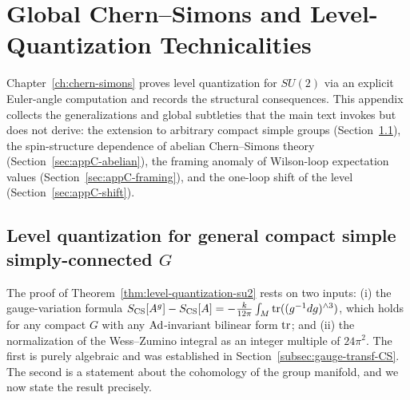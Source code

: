 %
%

\chapter{Global Chern--Simons and Level-Quantization Technicalities}\label{app:cs-global}

Chapter~\ref{ch:chern-simons} proves level quantization for $SU(2)$ via an explicit Euler-angle computation and records the structural consequences. This appendix collects the generalizations and global subtleties that the main text invokes but does not derive: the extension to arbitrary compact simple groups (Section~\ref{sec:appC-general-G}), the spin-structure dependence of abelian Chern--Simons theory (Section~\ref{sec:appC-abelian}), the framing anomaly of Wilson-loop expectation values (Section~\ref{sec:appC-framing}), and the one-loop shift of the level (Section~\ref{sec:appC-shift}).

\section{Level quantization for general compact simple simply-connected \texorpdfstring{$G$}{G}}\label{sec:appC-general-G}

The proof of Theorem~\ref{thm:level-quantization-su2} rests on two inputs: (i) the gauge-variation formula $S_{\operatorname{CS}}[A^g] - S_{\operatorname{CS}}[A] = -\frac{k}{12\pi}\int_M \operatorname{tr}((g^{-1}dg)^{\wedge 3})$, which holds for any compact $G$ with any $\operatorname{Ad}$-invariant bilinear form $\operatorname{tr}$; and (ii) the normalization of the Wess--Zumino integral as an integer multiple of $24\pi^2$. The first is purely algebraic and was established in Section~\ref{subsec:gauge-transf-CS}. The second is a statement about the cohomology of the group manifold, and we now state the result precisely.


